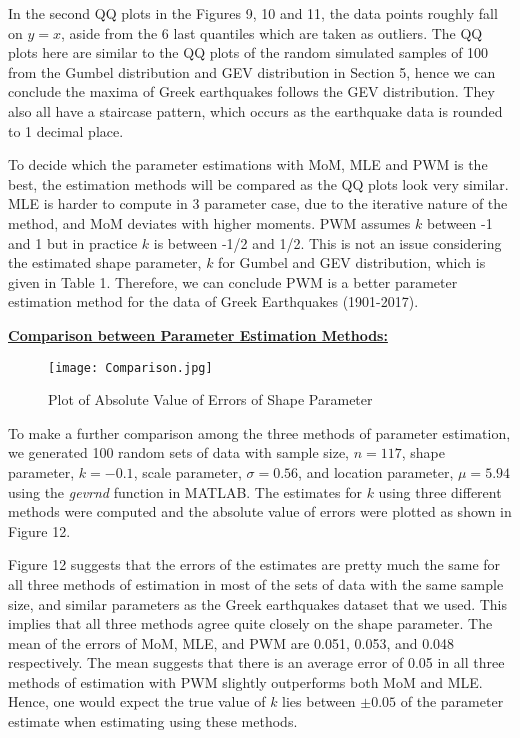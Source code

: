 \documentclass{article}
\begin{document}
In the second QQ plots in the Figures 9, 10 and 11, the data points roughly fall on $y=x$, aside from the 6 last quantiles which are taken as outliers. The QQ plots here are similar to the QQ plots of the random simulated samples of 100 from the Gumbel distribution and GEV distribution in Section 5, hence we can conclude the maxima of Greek earthquakes follows the GEV distribution. They also all have a staircase pattern, which occurs as the earthquake data is rounded to 1 decimal place.

To decide which the parameter estimations with MoM, MLE and PWM is the best, the estimation methods will be compared as the QQ plots look very similar. MLE is harder to compute in 3 parameter case, due to the iterative nature of the method, and MoM deviates with higher moments. PWM assumes $k$ between -1 and 1 but in practice $k$ is between -1/2 and 1/2. This is not an issue considering the estimated shape parameter, $k$ for Gumbel and GEV distribution, which is given in Table 1. Therefore, we can conclude PWM is a better parameter estimation method for the data of Greek Earthquakes (1901-2017). 
\newpage

\underline{\textbf{Comparison between Parameter Estimation Methods:}}

\begin{figure}[h]
\hspace*{-1cm}
\texttt{[image: Comparison.jpg]}
\vspace{-10mm}
\caption{Plot of Absolute Value of Errors of Shape Parameter}
\end{figure}

To make a further comparison among the three methods of parameter estimation, we generated 100 random sets of data with sample size, $n=117$, shape parameter, $k=-0.1$, scale parameter, $\sigma=0.56$, and location parameter, $\mu=5.94$ using the \textit{gevrnd} function in MATLAB. The estimates for $k$ using three different methods were computed and the absolute value of errors were plotted as shown in Figure 12. 

Figure 12 suggests that the errors of the estimates are pretty much the same for all three methods of estimation in most of the sets of data with the same sample size, and similar parameters as the Greek earthquakes dataset that we used. This implies that all three methods agree quite closely on the shape parameter. The mean of the errors of MoM, MLE, and PWM are 0.051, 0.053, and 0.048 respectively. The mean suggests that there is an average error of 0.05 in all three methods of estimation with PWM slightly outperforms both MoM and MLE. Hence, one would expect the true value of $k$ lies between $\pm0.05$ of the parameter estimate when estimating using these methods.
\end{document}
